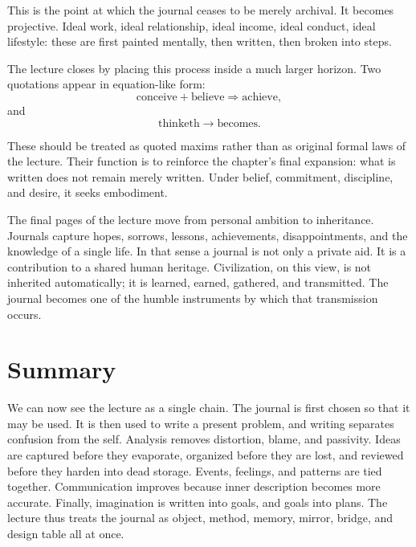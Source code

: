 This is the point at which the journal ceases to be merely archival. It becomes projective. Ideal work, ideal relationship, ideal income, ideal conduct, ideal lifestyle: these are first painted mentally, then written, then broken into steps.

The lecture closes by placing this process inside a much larger horizon. Two quotations appear in equation-like form:
\begin{equation}
\text{conceive}+\text{believe}\Rightarrow \text{achieve},
\end{equation}
and
\begin{equation}
\text{thinketh}\rightarrow \text{becomes}.
\end{equation}

These should be treated as quoted maxims rather than as original formal laws of the lecture. Their function is to reinforce the chapter's final expansion: what is written does not remain merely written. Under belief, commitment, discipline, and desire, it seeks embodiment.

The final pages of the lecture move from personal ambition to inheritance. Journals capture hopes, sorrows, lessons, achievements, disappointments, and the knowledge of a single life. In that sense a journal is not only a private aid. It is a contribution to a shared human heritage. Civilization, on this view, is not inherited automatically; it is learned, earned, gathered, and transmitted. The journal becomes one of the humble instruments by which that transmission occurs.

\section{Summary}

We can now see the lecture as a single chain. The journal is first chosen so that it may be used. It is then used to write a present problem, and writing separates confusion from the self. Analysis removes distortion, blame, and passivity. Ideas are captured before they evaporate, organized before they are lost, and reviewed before they harden into dead storage. Events, feelings, and patterns are tied together. Communication improves because inner description becomes more accurate. Finally, imagination is written into goals, and goals into plans. The lecture thus treats the journal as object, method, memory, mirror, bridge, and design table all at once.